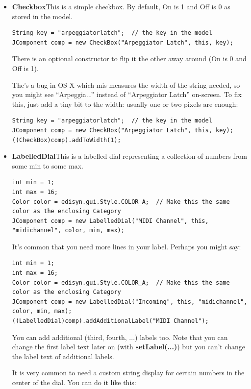 \documentclass{article}
\begin{document}
\begin{itemize}
\item {\bf Checkbox}\quad This is a simple checkbox.  By default, On is 1 and Off is 0 as stored in the model. 

\begin{verbatim}
String key = "arpeggiatorlatch";  // the key in the model
JComponent comp = new CheckBox("Arpeggiator Latch", this, key);
\end{verbatim}

There is an optional constructor to flip it the other away around (On is 0 and Off is 1).

The's a bug in OS X which mis-measures the width of the string needed, so you might see ``Arpeggia...'' instead of ``Arpeggiator Latch'' on-screen.  To fix this, just add a tiny bit to the width: usually one or two pixels are enough:

\begin{verbatim}
String key = "arpeggiatorlatch";  // the key in the model
JComponent comp = new CheckBox("Arpeggiator Latch", this, key);
((CheckBox)comp).addToWidth(1);
\end{verbatim}

\item {\bf LabelledDial}\quad This is a labelled dial representing a collection of numbers from some min to some max.

\begin{verbatim}
int min = 1;
int max = 16;
Color color = edisyn.gui.Style.COLOR_A;  // Make this the same color as the enclosing Category
JComponent comp = new LabelledDial("MIDI Channel", this, "midichannel", color, min, max);
\end{verbatim}

It's common that you need more lines in your label.  Perhaps you might say:

\begin{verbatim}
int min = 1;
int max = 16;
Color color = edisyn.gui.Style.COLOR_A;  // Make this the same color as the enclosing Category
JComponent comp = new LabelledDial("Incoming", this, "midichannel", color, min, max);
((LabelledDial)comp).addAdditionalLabel("MIDI Channel");
\end{verbatim}

You can add additional (third, fourth, ...) labels too.  Note that you can change the first label text later on (with {\bf setLabel(...)}) but you can't change the label text of additional labels.

It is very common to need a custom string display for certain numbers in the center of the dial. You can do it like this:


\end{itemize}
\end{document}
